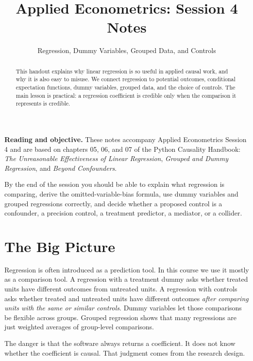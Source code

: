 

\title{Applied Econometrics: Session 4 Notes}
\author{Regression, Dummy Variables, Grouped Data, and Controls}
\date{}



\maketitle

\begin{abstract}
This handout explains why linear regression is so useful in applied causal
work, and why it is also easy to misuse. We connect regression to potential
outcomes, conditional expectation functions, dummy variables, grouped data,
and the choice of controls. The main lesson is practical: a regression
coefficient is credible only when the comparison it represents is credible.
\end{abstract}

\begin{boxD}
\textbf{Reading and objective.} These notes accompany Applied Econometrics
Session 4 and are based on chapters 05, 06, and 07 of the Python Causality
Handbook: \emph{The Unreasonable Effectiveness of Linear Regression},
\emph{Grouped and Dummy Regression}, and \emph{Beyond Confounders}.

By the end of the session you should be able to explain what regression is
comparing, derive the omitted-variable-bias formula, use dummy variables and
grouped regressions correctly, and decide whether a proposed control is a
confounder, a precision control, a treatment predictor, a mediator, or a
collider.
\end{boxD}

\section{The Big Picture}

Regression is often introduced as a prediction tool. In this course we use it
mostly as a comparison tool. A regression with a treatment dummy asks whether
treated units have different outcomes from untreated units. A regression with
controls asks whether treated and untreated units have different outcomes
\emph{after comparing units with the same or similar controls}. Dummy
variables let those comparisons be flexible across groups. Grouped regression
shows that many regressions are just weighted averages of group-level
comparisons.

The danger is that the software always returns a coefficient. It does not know
whether the coefficient is causal. That judgment comes from the research
design.

